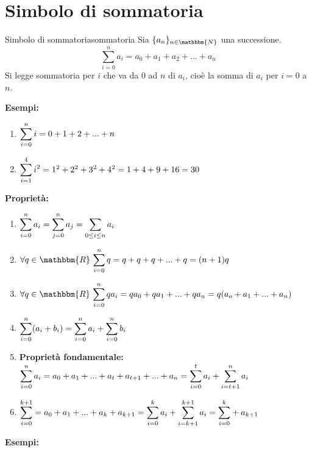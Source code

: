 \documentclass[12pt, letterpaper]{report}
\newcounter{definition}
\newcommand{\nmu}{}
\begin{document}
 		\section{Simbolo di sommatoria}
 		 \begin{definition}{\nmu Simbolo di sommatoria}{sommatoria}
 			Sia $\{a_n\}_{n \in \mathbbm{N}}$ una successione.
 			\[
 			\sum_{i=0}^{n}a_i = a_0 + a_1 + a_2 + ... + a_n
 			\]
 			Si legge sommatoria per $i$ che va da $0$ ad $n$ di $a_i$, cioè la somma di $a_i$ per $i = 0$ a $n$.
  		\end{definition}
  		\textbf{Esempi:}
  		\begin{enumerate}
  			\item $\mathlarger{\sum_{i = 0}^{n}i} = 0 + 1 + 2 + ... + n$
  			\item $\mathlarger{\sum_{i = 1}^{4}i^2} = 1^2 + 2^2 + 3^2 + 4^2 = 1 + 4 + 9 + 16 = 30$
  		\end{enumerate}
  		\textbf{\color{red}Proprietà:}
  		\begin{enumerate}
  			\item $\mathlarger{\sum_{i=0}^{n}a_i} = \mathlarger{\sum_{j = 0}^{n}a_j} = \mathlarger{\sum_{0 \leq i \leq n}a_i}$
  			\item $\forall q \in \mathbbm{R} \ \mathlarger{\sum_{i = 0}^{n}q} = q + q + q + ... + q = (n + 1)q$
  			\item $\forall q \in \mathbbm{R} \ \mathlarger{\sum_{i = 0}^{n}qa_i} = qa_0 + qa_1 + ... + qa_n = q(a_o + a_1 + ... + a_n)$
  			\item $\mathlarger{\sum_{i = 0}^{n}(a_i + b_i)} = \mathlarger{\sum_{i = 0}^{n}a_i} + \mathlarger{\sum_{i=0}^{n}b_i}$
  			\item \textbf{Proprietà fondamentale:} \\ $\mathlarger{\sum_{i=0}^{n}a_i} = a_0 + a_1 + ... + a_t + a_{t + 1} + ... + a_n = \mathlarger{\sum_{i = 0}^{t}a_i} + \mathlarger{\sum_{i = t + 1}^{n}a_i}$
  			\item $\mathlarger{\sum_{i=0}^{k+1}} = a_0 + a_1 + ... + a_k + a_{k + 1} = \mathlarger{\sum_{i = 0}^{k}a_i} + \mathlarger{\sum_{i=k+1}^{k+1}a_i} = \mathlarger{\sum_{i=0}^{k}} + a_{k+1}$
  		\end{enumerate}
  		\textbf{Esempi:}
\end{document}
